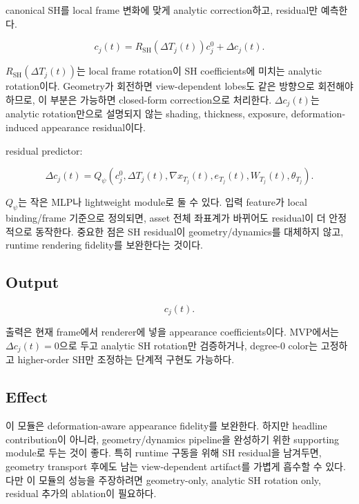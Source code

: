 \documentclass[11pt,a4paper]{article}
\begin{document}
canonical SH를 local frame 변화에 맞게 analytic correction하고, residual만 예측한다.

\begin{equation}
c_j(t)=R_{\mathrm{SH}}(\Delta T_j(t))c_j^0+\Delta c_j(t).
\end{equation}

$R_{\mathrm{SH}}(\Delta T_j(t))$는 local frame rotation이 SH coefficients에 미치는 analytic rotation이다.
Geometry가 회전하면 view-dependent lobes도 같은 방향으로 회전해야 하므로, 이 부분은 가능하면 closed-form correction으로 처리한다.
$\Delta c_j(t)$는 analytic rotation만으로 설명되지 않는 shading, thickness, exposure, deformation-induced appearance residual이다.

residual predictor:

\begin{equation}
\Delta c_j(t)=Q_\psi(c_j^0,\Delta T_j(t),\nabla x_{T_j}(t),e_{T_j}(t),W_{T_j}(t),\theta_{T_j}).
\end{equation}

$Q_\psi$는 작은 MLP나 lightweight module로 둘 수 있다.
입력 feature가 local binding/frame 기준으로 정의되면, asset 전체 좌표계가 바뀌어도 residual이 더 안정적으로 동작한다.
중요한 점은 SH residual이 geometry/dynamics를 대체하지 않고, runtime rendering fidelity를 보완한다는 것이다.

\subsection*{Output}

\begin{equation}
c_j(t).
\end{equation}

출력은 현재 frame에서 renderer에 넣을 appearance coefficients이다.
MVP에서는 $\Delta c_j(t)=0$으로 두고 analytic SH rotation만 검증하거나, degree-0 color는 고정하고 higher-order SH만 조정하는 단계적 구현도 가능하다.

\subsection*{Effect}

이 모듈은 deformation-aware appearance fidelity를 보완한다. 하지만 headline contribution이 아니라, geometry/dynamics pipeline을 완성하기 위한 supporting module로 두는 것이 좋다.
특히 runtime 구동을 위해 SH residual을 남겨두면, geometry transport 후에도 남는 view-dependent artifact를 가볍게 흡수할 수 있다.
다만 이 모듈의 성능을 주장하려면 geometry-only, analytic SH rotation only, residual 추가의 ablation이 필요하다.
\end{document}
